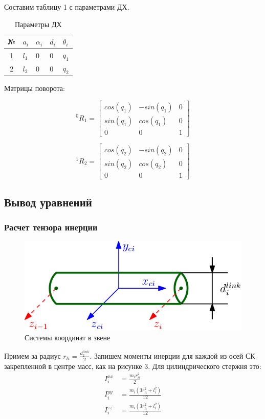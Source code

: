 \documentclass[a4paper,14pt]{extreport}
\begin{document}
Составим таблицу 1 с параметрами ДХ.

\begin{table}[H]
	\centering
	\caption{Параметры ДХ}
	\label{my-label}
	\begin{tabular}{|c|l|l|l|l|}
		\hline
		№ & $a_i$ & $\alpha_i$ & $d_i$ & $\theta_i$ \\ \hline
		1 & $l_1$ & 0 & 0 & $q_1$ \\ \hline
		2 & $l_2$ & 0 & 0 & $q_2$ \\ \hline
	\end{tabular}
\end{table}

Матрицы поворота:

\begin{equation}
	^0R_1 =
	\begin{bmatrix}
		cos(q_1) & -sin(q_1) & 0\\
		sin(q_1)& cos(q_1) &0 \\
		0&0 &1
	\end{bmatrix}
\end{equation}

\begin{equation}
	^1R_2 =
	\begin{bmatrix}
	cos(q_2) & -sin(q_2) & 0\\
	sin(q_2)& cos(q_2) &0 \\
	0&0 &1
	\end{bmatrix}
\end{equation}


\subsection{Вывод уравнений}

\subsubsection{Расчет тензора инерции}

\begin{figure}[H]
	\center\includegraphics[width=0.8\linewidth]{images/3.png}
	\caption{Системы координат в звене}
	\label{fig:scr1}
\end{figure}
Примем за радиус $r_{li} = \frac{d^{link}_2}{2}$. Запишем моменты инерции для каждой из осей СК закрепленной в центре масс, как на рисунке 3. Для цилиндрического стержня это:
\begin{align}
	I_i^{xx} &= \frac{m_i r_{li}^2}{2} \\
	I_i^{yy} &= \frac{m_i (3 r_{li}^2 + l_i^2)}{12} \\
	I_i^{zz} &= \frac{m_i (3 r_{li}^2 + l_i^2)}{12}
\end{align}
\end{document}
